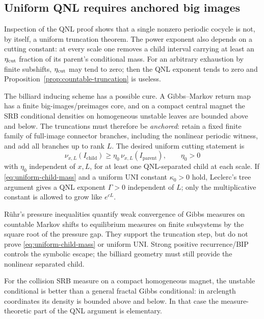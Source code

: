 \documentclass[11pt]{article}
\begin{document}
\subsection{Uniform QNL requires anchored big images}

Inspection of the QNL proof shows that a single nonzero periodic cocycle is
not, by itself, a uniform truncation theorem.  The power exponent also depends
on a cutting constant: at every scale one removes a child interval carrying
at least an $\eta_{\rm cut}$ fraction of its parent's conditional mass.  For
an arbitrary exhaustion by finite subshifts, $\eta_{\rm cut}$ may tend to
zero; then the QNL exponent tends to zero and
Proposition~\ref{prop:countable-truncation} is useless.

The billiard inducing scheme has a possible cure.  A Gibbs--Markov return map
has a finite big-images/preimages core, and on a compact central magnet the
SRB conditional densities on homogeneous unstable leaves are bounded above
and below.  The truncations must therefore be \emph{anchored}: retain a fixed
finite family of full-image connector branches, including the nonlinear
periodic witness, and add all branches up to rank $L$.  The desired uniform
cutting statement is
\begin{equation}
\label{eq:uniform-child-mass}
 \nu_{x,L}(I_{\mathrm{child}})
 \ge\eta_0\,\nu_{x,L}(I_{\mathrm{parent}}),
 \qquad \eta_0>0
\end{equation}
with $\eta_0$ independent of $x,L$, for at least one QNL-separated child at
each scale.  If \eqref{eq:uniform-child-mass} and a uniform UNI constant
$\kappa_0>0$ hold, Leclerc's tree argument gives a QNL exponent
$\Gamma>0$ independent of $L$; only the multiplicative constant is allowed
to grow like $e^{cL}$.

R\"uhr's pressure inequalities quantify weak convergence of Gibbs measures
on countable Markov shifts to equilibrium measures on finite subsystems by
the square root of the pressure gap.  They support the truncation step, but
do not prove \eqref{eq:uniform-child-mass} or uniform UNI.  Strong positive
recurrence/BIP controls the symbolic escape; the billiard geometry must still
provide the nonlinear separated child.

For the collision SRB measure on a compact homogeneous magnet, the unstable
conditional is better than a general fractal Gibbs conditional: in arclength
coordinates its density is bounded above and below.  In that case the
measure-theoretic part of the QNL argument is elementary.
\end{document}
